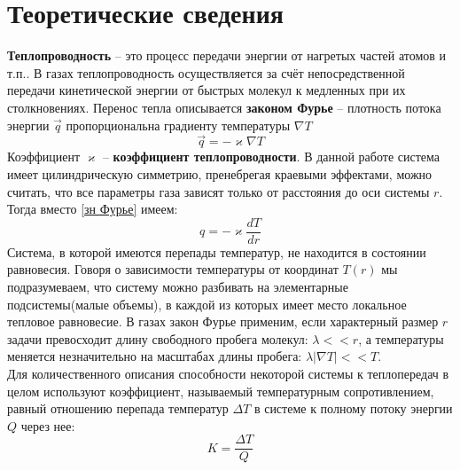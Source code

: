 \documentclass[12pt]{article}
\begin{document}
    \section{Теоретические сведения}
        \textbf{Теплопроводность} -- это процесс передачи энергии от нагретых частей атомов и т.п.. В газах теплопроводность осуществляется за
        счёт непосредственной передачи кинетической энергии от быстрых молекул к медленных при их столкновениях. Перенос тепла
        описывается \textbf{законом Фурье} \cite{sivykhin} -- плотность потока энергии $\vec{q}$ пропорциональна градиенту температуры $\nabla T$
        \begin{equation}\label{зн Фурье}
            \vec{q} = - \varkappa \nabla T
        \end{equation}
        Коэффициент $\varkappa$ -- \textbf{коэффициент теплопроводности}. В данной работе система имеет цилиндрическую симметрию, пренебрегая краевыми эффектами,
        можно считать, что все параметры газа зависят только от расстояния до оси системы $r$. Тогда вместо \ref{зн Фурье} имеем:
        \begin{equation}\label{tepl}
            q = - \varkappa \frac{dT}{dr}
        \end{equation}
        Система, в которой имеются перепады температур, не находится в состоянии равновесия. Говоря о зависимости температуры от координат $T(r)$ мы подразумеваем, что систему
        можно разбивать на элементарные подсистемы(малые объемы), в каждой из которых имеет место локальное тепловое равновесие. В газах
        закон Фурье применим, если характерный размер $r$ задачи превосходит длину свободного пробега молекул: $\lambda << r$, а температуры меняется незначительно на масштабах
        длины пробега: $\lambda|\nabla T| << T$.\\
        Для количественного описания способности некоторой системы к теплопередач в целом используют коэффициент, называемый температурным сопротивлением,
        равный отношению перепада температур $\Delta T$ в системе к полному потоку энергии $Q$ через нее:
        \begin{equation}\label{q = }
            K = \frac{\Delta T}{Q}
        \end{equation}\\
\end{document}
